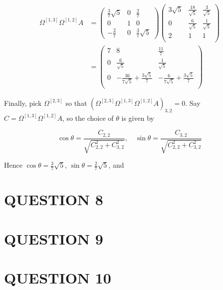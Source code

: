 \documentclass[a4paper]{article}
\begin{document}
\begin{align*}
\Omega^{[1,3]}\Omega^{[1,2]}A  & =  \begin{pmatrix}
\frac{3}{7} \sqrt{5} & 0 & \frac{2}{7} \\
0 & 1 & 0 \\
- \frac{2}{7} & 0 & \frac{3}{7} \sqrt{5}
\end{pmatrix} \left(
\begin{array}{ccc}
3 \sqrt{5} & \frac{18}{\sqrt{5}} &
\frac{3}{\sqrt{5}} \\
0 & \frac{6}{\sqrt{5}} &
\frac{1}{\sqrt{5}} \\
2 & 1 & 1 \\
\end{array}
\right)  \\
& = \left(
\begin{array}{ccc}
7 & 8 & \frac{11}{7} \\
0 & \frac{6}{\sqrt{5}} &
\frac{1}{\sqrt{5}} \\
0 & -\frac{36}{7 \sqrt{5}}+\frac{3
	\sqrt{5}}{7} & -\frac{6}{7
	\sqrt{5}}+\frac{3 \sqrt{5}}{7} \\
\end{array}
\right) 
\end{align*}


Finally, pick $ \Omega^{[2,3]} $ so that $ (\Omega^{[2,3]} \Omega^{[1,3]}\Omega^{[1,2]}A)_{3,2} = 0 $. Say $ C = \Omega^{[1,3]} \Omega^{[1,2]} A $, so the choice of $ \theta $ is given by

\[ \cos \theta = \frac{C_{2,2}}{\sqrt{C_{2,2}^{2} + C_{3,2}^{2}}}, \quad \sin \theta  = \frac{C_{3,2}}{\sqrt{C_{2,2}^{2} + C_{3,2}^{2}}}  \]

Hence $ \cos \theta = \frac{3}{7} \sqrt{5} $, $ \sin \theta = \frac{2}{7} \sqrt{5} $, and






\section{QUESTION 8}
\section{QUESTION 9}


\section{QUESTION 10}
\end{document}
